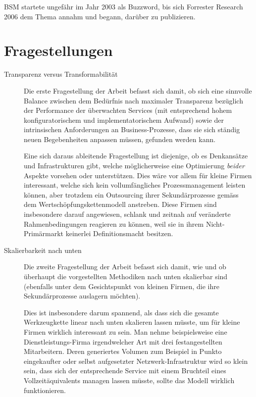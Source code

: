 \documentclass[11pt,listof=totoc]{scrreprt} %
\theoremstyle{definition}
\begin{document}
BSM startete ungefähr im Jahr 2003 als Buzzword, bis sich Forrester Research 2006 dem Thema annahm und begann, darüber zu publizieren. \cite{wiki:bsm, forrester:bsm, forrester:implementingBsm}

\section{Fragestellungen}

\begin{description}
\item[Transparenz versus Transformabilität]
Die erste Fragestellung der Arbeit befasst sich damit, ob sich eine sinnvolle Balance zwischen dem Bedürfnis nach maximaler Transparenz bezüglich der Performance der überwachten Services (mit entsprechend hohem konfiguratorischem und implementatorischem Aufwand) sowie der intrinsischen Anforderungen an Business-Prozesse, dass sie sich ständig neuen Begebenheiten anpassen müssen, gefunden werden kann.

Eine sich daraus ableitende Fragestellung ist diejenige, ob es Denkansätze und Infrastrukturen gibt, welche möglicherweise eine Optimierung {\em beider} Aspekte vorsehen oder unterstützen. Dies wäre vor allem für kleine Firmen interessant, welche sich kein vollumfängliches Prozessmanagement leisten können, aber trotzdem ein Outsourcing ihrer Sekundärprozesse gemäss dem Wertschöpfungskettenmodell \cite{Finkeissen200001} anstreben. Diese Firmen sind insbesondere darauf angewiesen, schlank und zeitnah auf veränderte Rahmenbedingungen reagieren zu können, weil sie in ihrem Nicht-Primärmarkt keinerlei Definitionsmacht besitzen.
\item[Skalierbarkeit nach unten] Die zweite Fragestellung der Arbeit befasst sich damit, wie und ob überhaupt die vorgestellten Methodiken nach unten skalierbar sind (ebenfalls unter dem Gesichtspunkt von kleinen Firmen, die ihre Sekundärprozesse auslagern möchten).

Dies ist insbesondere darum spannend, als dass sich die gesamte Werkzeugkette linear nach unten skalieren lassen müsste, um für kleine Firmen wirklich interessant zu sein. Man nehme beispielsweise eine Dienstleistungs-Firma irgendwelcher Art mit drei festangestellten Mitarbeitern. Deren generiertes Volumen zum Beispiel in Punkto eingekaufter oder selbst aufgesetzter Netzwerk-Infrastruktur wird so klein sein, dass sich der entsprechende Service mit einem Bruchteil eines Vollzeitäquivalents managen lassen müsste, sollte das Modell wirklich funktionieren.
\end{description}
\end{document}
